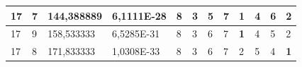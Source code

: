 \documentclass[conference]{IEEEtran}
\begin{document}
\begin{table}[]
\begin{tabular}{|llll|llllllll|}
\multicolumn{1}{|l|}{17}                                                    & \multicolumn{1}{l|}{7}                                                        & \multicolumn{1}{l|}{144,388889}                                                   & 6,1111E-28                     & \multicolumn{1}{l|}{8}                                                  & \multicolumn{1}{l|}{3}                                                  & \multicolumn{1}{l|}{5}                                                  & \multicolumn{1}{l|}{7}                                                  & \multicolumn{1}{l|}{\textbf{1}}                                         & \multicolumn{1}{l|}{4}                                                  & \multicolumn{1}{l|}{6}                                                  & 2                          \\ \hline
\multicolumn{1}{|l|}{17}                                                    & \multicolumn{1}{l|}{9}                                                        & \multicolumn{1}{l|}{158,533333}                                                   & 6,5285E-31                     & \multicolumn{1}{l|}{8}                                                  & \multicolumn{1}{l|}{3}                                                  & \multicolumn{1}{l|}{6}                                                  & \multicolumn{1}{l|}{7}                                                  & \multicolumn{1}{l|}{\textbf{1}}                                         & \multicolumn{1}{l|}{4}                                                  & \multicolumn{1}{l|}{5}                                                  & 2                          \\ \hline
\multicolumn{1}{|l|}{17}                                                    & \multicolumn{1}{l|}{8}                                                        & \multicolumn{1}{l|}{171,833333}                                                   & 1,0308E-33                     & \multicolumn{1}{l|}{8}                                                  & \multicolumn{1}{l|}{3}                                                  & \multicolumn{1}{l|}{6}                                                  & \multicolumn{1}{l|}{7}                                                  & \multicolumn{1}{l|}{2}                                                  & \multicolumn{1}{l|}{5}                                                  & \multicolumn{1}{l|}{4}                                                  & \textbf{1}                 \\ \hline

\end{tabular}
\end{table}
\end{document}
